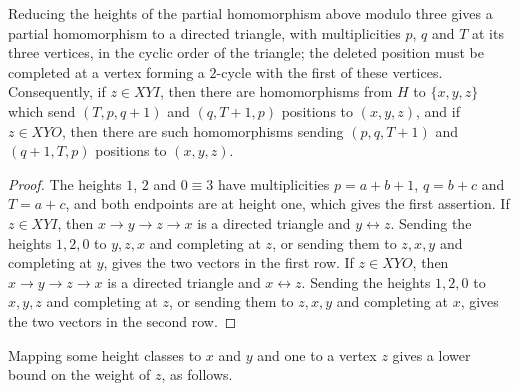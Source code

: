 \begin{lemma}
\label{root391:internal-profiles}\label{root406:profile-part}
Reducing the heights of the partial homomorphism above modulo three gives a partial homomorphism to a directed triangle, with multiplicities $p$, $q$ and $T$ at its three vertices, in the cyclic order of the triangle; the deleted position must be completed at a vertex forming a $2$-cycle with the first of these vertices.
Consequently, if $z\in XYI$, then there are homomorphisms from $H$ to $\{x,y,z\}$ which send $(T,p,q+1)$ and $(q,T+1,p)$ positions to $(x,y,z)$, and if $z\in XYO$, then there are such homomorphisms sending $(p,q,T+1)$ and $(q+1,T,p)$ positions to $(x,y,z)$.
\end{lemma}
\begin{proof}
The heights $1$, $2$ and $0\equiv3$ have multiplicities $p=a+b+1$, $q=b+c$ and $T=a+c$, and both endpoints are at height one, which gives the first assertion.
If $z\in XYI$, then $x\to y\to z\to x$ is a directed triangle and $y\leftrightarrow z$. Sending the heights $1,2,0$ to $y,z,x$ and completing at $z$, or sending them to $z,x,y$ and completing at $y$, gives the two vectors in the first row.
If $z\in XYO$, then $x\to y\to z\to x$ is a directed triangle and $x\leftrightarrow z$. Sending the heights $1,2,0$ to $x,y,z$ and completing at $z$, or sending them to $z,x,y$ and completing at $x$, gives the two vectors in the second row.
\end{proof}

Mapping some height classes to $x$ and $y$ and one to a vertex $z$ gives a lower bound on the weight of $z$, as follows.

